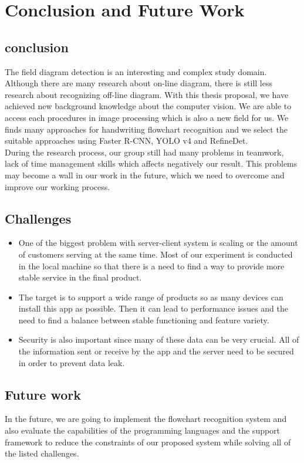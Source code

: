 \chapter{Conclusion and Future Work} \label{chap:conclusion}

\section{conclusion}
The field diagram detection is an interesting and complex study domain. Although there are many research about on-line diagram, there is still less research about recognizing off-line diagram. With this thesis proposal, we have achieved new background knowledge about the computer vision. We are able to access each procedures in image processing which is also a new field for us. We finds many approaches for handwriting flowchart recognition and we select the suitable approaches using Faster R-CNN, YOLO v4 and RefineDet.\\
During the research process, our group still had many problems in teamwork, lack of time management skills which affects negatively our result. This problems may become a wall in our work in the future, which we need to overcome and improve our working process.

\section{Challenges}
\begin{itemize}
    \item One of the biggest problem with server-client system is scaling or the amount of customers serving at the same time. Most of our experiment is conducted in the local machine so that there is a need to find a way to provide more stable service in the final product.
    \item The target is to support a wide range of products so as many devices can install this app as possible. Then it can lead to performance issues and the need to find a balance between stable functioning and feature variety.
    \item Security is also important since many of these data can be very crucial. All of the information sent or receive by the app and the server need to be secured in order to prevent data leak.
\end{itemize}

\section{Future work}
In the future, we are going to implement the flowchart recognition system and also evaluate the capabilities of the programming languages and the support framework to reduce the constraints of our proposed system while solving all of the listed challenges.